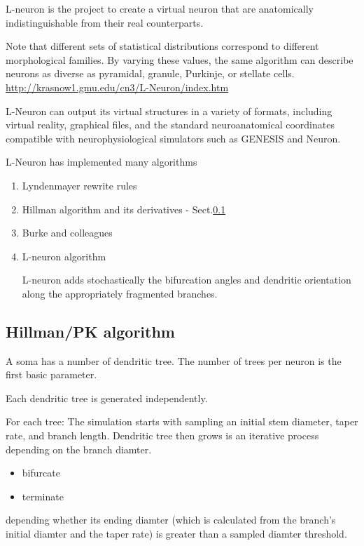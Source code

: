 L-neuron is the project to create a virtual neuron  that are anatomically
indistinguishable from their real counterparts.

Note that different sets of statistical distributions correspond to different
morphological families. By varying these values, the same algorithm can describe
neurons as diverse as pyramidal, granule, Purkinje, or stellate cells.
\url{http://krasnow1.gmu.edu/cn3/L-Neuron/index.htm}

L-Neuron can output its virtual structures in a variety of formats, including
virtual reality, graphical files, and the standard neuroanatomical coordinates
compatible with neurophysiological simulators such as GENESIS and Neuron.

L-Neuron has implemented many algorithms
\begin{enumerate}
  \item Lyndenmayer rewrite rules
  
  \item Hillman algorithm and its derivatives - Sect.\ref{sec:Hillman-PK-algorithm}
  
  \item Burke and colleagues
  
  \item L-neuron algorithm

L-neuron adds stochastically the bifurcation angles and dendritic orientation
along the appropriately fragmented branches.

\end{enumerate}

\subsection{Hillman/PK algorithm}
\label{sec:Hillman-PK-algorithm}

A soma has a number of dendritic tree. The number of trees per neuron is the
first basic parameter.

Each dendritic tree is generated independently. 

For each tree: The simulation starts with sampling an initial stem diameter,
taper rate, and branch length. Dendritic tree then grows is an iterative process
depending on the branch diamter.
\begin{itemize}
  \item bifurcate
  \item terminate
\end{itemize}
depending whether its ending diamter (which is calculated from the branch's
initial diamter and the taper rate) is greater than a sampled diamter threshold.


